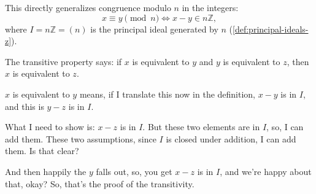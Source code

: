 \begin{content}

\begin{steps}
This directly generalizes congruence modulo $n$ in the integers:
\[
x \equiv y \pmod n \iff x - y \in n\mathbb{Z},
\]
where $I = n\mathbb{Z} = (n)$ is the principal ideal generated by $n$ (\cref{def:principal-ideals-z}).
\end{steps}
\end{content}

\begin{speech}[00:31:57 - 00:32:50]
 The transitive property says: if $x$ is equivalent to $y$ and $y$ is equivalent to $z$, then $x$ is equivalent to $z$.  

$x$ is equivalent to $y$ means, if I translate this now in the definition, $x - y$ is in $I$,  and this is $y - z$ is in $I$.  

What I need to show is: $x - z$ is in $I$. But these two elements are in $I$, so, I can add them.  These two assumptions, since $I$ is closed under addition, I can add them. Is that clear? 

And then happily the $y$ falls out, so, you get $x - z$ is in $I$,  and we're happy about that, okay? So, that's the proof of the transitivity.
\end{speech}

